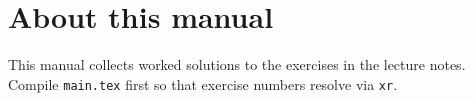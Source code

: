 \chapter*{About this manual}
This manual collects worked solutions to the exercises in the lecture notes.
Compile \texttt{main.tex} first so that exercise numbers resolve via \texttt{xr}.
